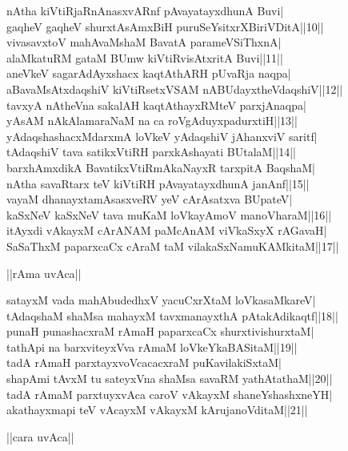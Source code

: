 \documentclass{article}
\begin{document}
nAtha kiVtiRjaRnAnasxvARnf pAvayatayxdhunA Buvi|\\
gaqheV gaqheV shurxtAsAmxBiH puruSeYsitxrXBiriVDitA||10||\\
vivasavxtoV mahAvaMshaM BavatA parameVSiThxnA|\\
alaMkatuRM gataM BUmw kiVtiRvisAtxritA Buvi||11||\\
aneVkeV sagarAdAyxshacx kaqtAthARH pUvaRja naqpa|\\
aBavaMsAtxdaqshiV kiVtiRsetxVSAM nABUdayxtheVdaqshiV||12||\\
tavxyA nAtheVna sakalAH kaqtAthayxRMteV parxjAnaqpa|\\
yAsAM nAkAlamaraNaM na ca roVgAduyxpadurxtiH||13||\\
yAdaqshashacxMdarxmA loVkeV yAdaqshiV jAhanxviV saritf|\\
tAdaqshiV tava satikxVtiRH parxkAshayati BUtalaM||14||\\
barxhAmxdikA BavatikxVtiRmAkaNayxR tarxpitA BaqshaM|\\
nAtha savaRtarx teV kiVtiRH pAvayatayxdhunA janAnf||15||\\
vayaM dhanayxtamAsasxveRV yeV cArAsatxva BUpateV|\\
kaSxNeV kaSxNeV tava muKaM loVkayAmoV manoVharaM||16||\\
itAyxdi vAkayxM cArANAM paMcAnAM viVkaSxyX rAGavaH|\\
SaSaThxM paparxcaCx cAraM taM vilakaSxNamuKAMkitaM||17||\\

\begin{center}
||rAma uvAca||
\end{center}

satayxM vada mahAbudedhxV yacuCxrXtaM loVkasaMkareV|\\
tAdaqshaM shaMsa mahayxM tavxmanayxthA pAtakAdikaqtf||18||\\
punaH punashacxraM rAmaH paparxcaCx shurxtivishurxtaM|\\
tathApi na barxviteyxVva rAmaM loVkeYkaBASitaM||19||\\
tadA rAmaH parxtayxvoVcacacxraM puKavilakiSxtaM|\\
shapAmi tAvxM tu sateyxVna shaMsa savaRM yathAtathaM||20||\\
tadA rAmaM parxtuyxvAca caroV vAkayxM shaneYshashxneYH|\\
akathayxmapi teV vAcayxM vAkayxM kArujanoVditaM||21||\\

\begin{center}
||cara uvAca||
\end{center}
\end{document}
